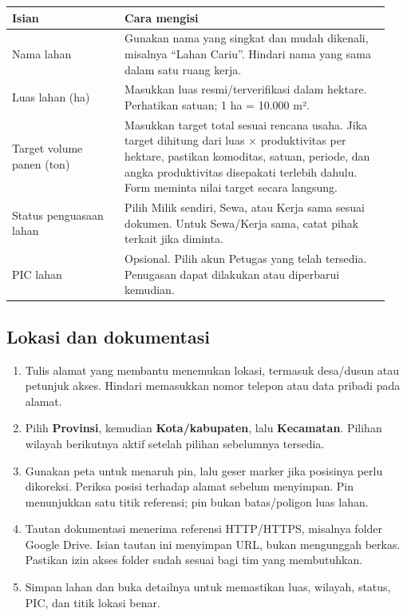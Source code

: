 \documentclass[11pt,a4paper]{article}
\begin{document}
\begin{longtable}{p{0.28\linewidth}p{0.66\linewidth}}\toprule

Isian & Cara mengisi \\

\midrule

Nama lahan & Gunakan nama yang singkat dan mudah dikenali, misalnya “Lahan Cariu”. Hindari nama yang sama dalam satu ruang kerja. \\

Luas lahan (ha) & Masukkan luas resmi/terverifikasi dalam hektare. Perhatikan satuan; 1 ha = 10.000 m². \\

Target volume panen (ton) & Masukkan target total sesuai rencana usaha. Jika target dihitung dari luas × produktivitas per hektare, pastikan komoditas, satuan, periode, dan angka produktivitas disepakati terlebih dahulu. Form meminta nilai target secara langsung. \\

Status penguasaan lahan & Pilih Milik sendiri, Sewa, atau Kerja sama sesuai dokumen. Untuk Sewa/Kerja sama, catat pihak terkait jika diminta. \\

PIC lahan & Opsional. Pilih akun Petugas yang telah tersedia. Penugasan dapat dilakukan atau diperbarui kemudian. \\

\bottomrule\end{longtable}

\subsection{Lokasi dan dokumentasi}

\begin{enumerate}

\item Tulis alamat yang membantu menemukan lokasi, termasuk desa/dusun atau petunjuk akses. Hindari memasukkan nomor telepon atau data pribadi pada alamat.

\item Pilih \textbf{Provinsi}, kemudian \textbf{Kota/kabupaten}, lalu \textbf{Kecamatan}. Pilihan wilayah berikutnya aktif setelah pilihan sebelumnya tersedia.

\item Gunakan peta untuk menaruh pin, lalu geser marker jika posisinya perlu dikoreksi. Periksa posisi terhadap alamat sebelum menyimpan. Pin menunjukkan satu titik referensi; pin bukan batas/poligon luas lahan.

\item Tautan dokumentasi menerima referensi HTTP/HTTPS, misalnya folder Google Drive. Isian tautan ini menyimpan URL, bukan mengunggah berkas. Pastikan izin akses folder sudah sesuai bagi tim yang membutuhkan.

\item Simpan lahan dan buka detailnya untuk memastikan luas, wilayah, status, PIC, dan titik lokasi benar.

\end{enumerate}
\end{document}
